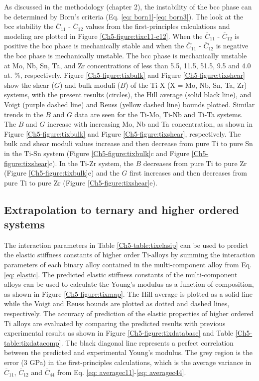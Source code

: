 As discussed in the methodology (chapter 2), the instability of the bcc phase can be determined by Born's criteria (Eq. \ref{eq: born1}-\ref{eq: born3}). The look at the bcc stability the $\overline{C}_{11}$ - $\overline{C}_{12}$ values from the first-principles calculations and modeling are plotted in Figure \ref{Ch5-figure:tixc11-c12}. When the $\overline{C}_{11}$ - $\overline{C}_{12}$ is positive the bcc phase is mechanically stable and when the $\overline{C}_{11}$ - $\overline{C}_{12}$ is negative the bcc phase is mechanically unstable. The bcc phase is mechanically unstable at Mo, Nb, Sn, Ta, and Zr concentrations of less than 5.5, 11.5, 51.5, 9.5 and 4.0 at. \%, respectively. Figure \ref{Ch5-figure:tixbulk} and Figure \ref{Ch5-figure:tixshear} show the shear ($G$) and bulk moduli ($B$) of the Ti-X (X = Mo, Nb, Sn, Ta, Zr) systems, with the present results (circles), the Hill average (solid black line), and Voigt (purple dashed line) and Reuss (yellow dashed line) bounds plotted. Similar trends in the $B$ and $G$ data are seen for the Ti-Mo, Ti-Nb and Ti-Ta systems. The $B$ and $G$ increase with increasing Mo, Nb and Ta concentration, as shown in Figure \ref{Ch5-figure:tixbulk} and Figure \ref{Ch5-figure:tixshear}, respectively.  The bulk and shear moduli values increase and then decrease from pure Ti to pure Sn in the Ti-Sn system (Figure \ref{Ch5-figure:tixbulk}c and Figure \ref{Ch5-figure:tixshear}c). In the Ti-Zr system, the $B$ decreases from pure Ti to pure Zr (Figure \ref{Ch5-figure:tixbulk}e) and the $G$ first increases and then decreases from pure Ti to pure Zr (Figure \ref{Ch5-figure:tixshear}e). 

\subsection{Extrapolation to ternary and higher ordered systems}

The interaction parameters in Table \ref{Ch5-table:tixelasip} can be used to predict the elastic stiffness constants of higher order Ti-alloys by summing the interaction parameters of each binary alloy contained in the multi-component alloy from Eq. \ref{eq: elastic}. The predicted elastic stiffness constants of the multi-component alloys can be used to calculate the Young's modulus as a function of composition, as shown in Figure \ref{Ch5-figure:tixmap}. The Hill average is plotted as a solid line while the Voigt and Reuss bounds are plotted as dotted and dashed lines, respectively. The accuracy of prediction of the elastic properties of higher ordered Ti alloys are evaluated by comparing the predicted results with previous experimental results \cite{Niinomi2012,Tane2010a,Geetha2009,Mohammed2014} as shown in Figure \ref{Ch5-figure:tixdatabase} and Table \ref{Ch5-table:tixdatacomp}. The black diagonal line represents a perfect correlation between the predicted and experimental Young's modulus. The grey region is the error (3 GPa) in the first-principles calculations, which is the average variance in $\overline{C}_{11}$, $\overline{C}_{12}$ and $\overline{C}_{44}$ from Eq. \ref{eq: averagec11}-\ref{eq: averagec44}. 

